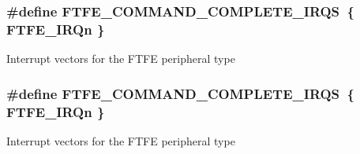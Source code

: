 \subsubsection[{\texorpdfstring{F\+T\+F\+E\+\_\+\+C\+O\+M\+M\+A\+N\+D\+\_\+\+C\+O\+M\+P\+L\+E\+T\+E\+\_\+\+I\+R\+QS}{FTFE_COMMAND_COMPLETE_IRQS}}]{\setlength{\rightskip}{0pt plus 5cm}\#define F\+T\+F\+E\+\_\+\+C\+O\+M\+M\+A\+N\+D\+\_\+\+C\+O\+M\+P\+L\+E\+T\+E\+\_\+\+I\+R\+QS~\{ {\bf F\+T\+F\+E\+\_\+\+I\+R\+Qn} \}}\hypertarget{group__FTFE__Peripheral__Access__Layer_gaaac748d7395492209690894787db8ce0}{}\label{group__FTFE__Peripheral__Access__Layer_gaaac748d7395492209690894787db8ce0}
Interrupt vectors for the F\+T\+FE peripheral type 
\subsubsection[{\texorpdfstring{F\+T\+F\+E\+\_\+\+C\+O\+M\+M\+A\+N\+D\+\_\+\+C\+O\+M\+P\+L\+E\+T\+E\+\_\+\+I\+R\+QS}{FTFE_COMMAND_COMPLETE_IRQS}}]{\setlength{\rightskip}{0pt plus 5cm}\#define F\+T\+F\+E\+\_\+\+C\+O\+M\+M\+A\+N\+D\+\_\+\+C\+O\+M\+P\+L\+E\+T\+E\+\_\+\+I\+R\+QS~\{ {\bf F\+T\+F\+E\+\_\+\+I\+R\+Qn} \}}\hypertarget{group__FTFE__Peripheral__Access__Layer_gaaac748d7395492209690894787db8ce0}{}\label{group__FTFE__Peripheral__Access__Layer_gaaac748d7395492209690894787db8ce0}
Interrupt vectors for the F\+T\+FE peripheral type 